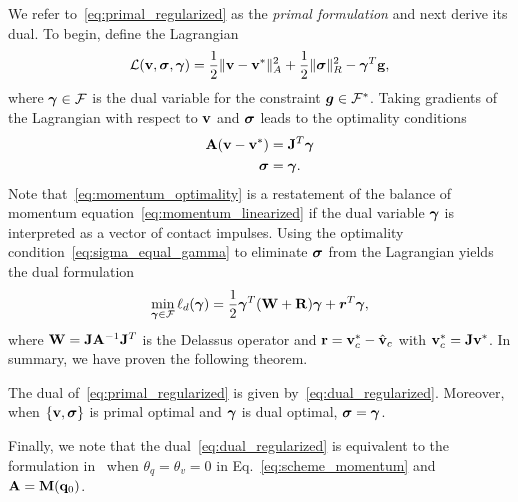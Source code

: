 We refer to~\eqref{eq:primal_regularized} as the \emph{primal formulation}
and next derive its dual. To begin, define the Lagrangian
\begin{equation}
    \mathcal{L}({\mathbf{v}},{\bm\sigma},{\bm{\gamma}}) = 
\frac{1}{2}\Vert{\mathbf{v}}-{\mathbf{v}}^*\Vert_A^2 + \frac{1}{2} \Vert{\bm\sigma}\Vert_{R}^2 - {\bm{\gamma}}^T{\mathbf{g}},
\end{equation}
where ${\bm{\gamma}}\in\mathcal{F}$ is the dual variable for the constraint
${\bm{g}}\in \mathcal{F}^*$. Taking gradients of the Lagrangian with respect to ${\mathbf{v}}$ and ${\bm\sigma}$ leads
to the optimality conditions
\begin{subequations}\label{eq:primal_optimality_conditions}
\begin{align}
    \mf{A}(\mf{v}-\mf{v}^*) &= \mf{J}^T\vf{\gamma} \label{eq:momentum_optimality}\\
    \vf{\sigma} &= \vf{\gamma}.  \label{eq:sigma_equal_gamma}
\end{align}
\end{subequations}
Note that~\eqref{eq:momentum_optimality} is a restatement
of the balance of momentum equation~\eqref{eq:momentum_linearized}
if the dual variable ${\bm\gamma}$ is interpreted as a vector of contact impulses. 
 Using the optimality
condition~\eqref{eq:sigma_equal_gamma} to eliminate ${\bm{\sigma}}$ from the
Lagrangian yields the dual formulation
\begin{align}
    \min_{\bgamma\in \mathcal{F}} \ell_d(\bgamma) =
    \frac{1}{2}\bgamma^T(\mathbf{W}+\mathbf{R})\bgamma + {\bm r}^T
    \bgamma,
	\label{eq:dual_regularized}
\end{align}
where ${\mathbf{W}}={\mathbf{J}}{\mathbf{A}}^{-1}{\mathbf{J}}^T$ is the Delassus operator and
${\mathbf{r}}={\mathbf{v}}_c^*-\hat{{\mathbf{v}}}_c$ with ${\mathbf{v}}_c^*={\mathbf{J}}{\mathbf{v}}^*$.
In summary, we have proven the following theorem.
\begin{theorem}\label{th:primal_dual} The dual of~\eqref{eq:primal_regularized}
	is given by~\eqref{eq:dual_regularized}. Moreover, when $\{{\mathbf{v}},{\bm\sigma}\}$ is
	primal optimal and ${\bm\gamma}$ is dual optimal, ${\bm\sigma} = {\bm\gamma}$.
\end{theorem}

Finally, we note that the dual~\eqref{eq:dual_regularized} is equivalent to the
formulation in~\cite{bib:todorov2011} when $\theta_{q} = \theta_v = 0$ in
Eq.~\eqref{eq:scheme_momentum} and ${\mathbf{A}}={\mathbf{M}}({\mathbf{q}}_0)$. 
